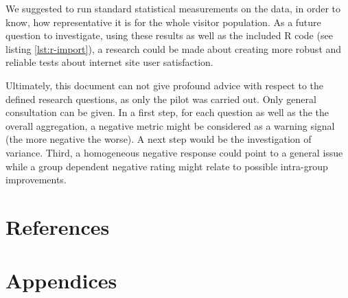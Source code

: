 \documentclass[12pt,a4paper,paper=a4,oneside,titlepage,pdftex]{scrartcl}
\begin{document}
We suggested to run standard statistical measurements on the data, in order to know, how representative it is for the whole visitor population. As a future question to investigate, using these results as well as the included R code (see listing \ref{lst:r-import}), a research could be made about creating more robust and reliable tests about internet site user satisfaction.

Ultimately, this document can not give profound advice with respect to the defined research questions, as only the pilot was carried out. Only general consultation can be given. In a first step, for each question as well as the the overall aggregation, a negative metric might be considered as a warning signal (the more negative the worse). A next step would be the investigation of variance. Third, a homogeneous negative response could point to a general issue while a group dependent negative rating might relate to possible intra-group improvements.

\newpage
\section*{References}

\renewcommand\refname{\vskip -1cm}


\newpage
\section{Appendices}
\end{document}

